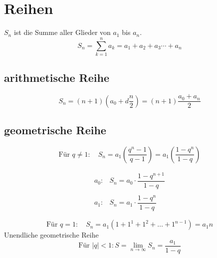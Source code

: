\section{Reihen}
$S_n$ ist die Summe aller Glieder von $a_1$ bis $a_n$. 
\[ \boxed{S_n = \sum_{k=1}^{n} a_k = a_1 + a_2 + a_3 \cdots + a_n} \]

\subsection{arithmetische Reihe}
\[ \boxed{S_n = \left(n + 1\right)\left(a_0 + d \frac{n}{2}\right) = \left(n + 1\right) \frac{a_0 + a_n}{2}} \]

\subsection{geometrische Reihe}
\[ \boxed{\text{Für } q \neq 1: \quad S_n = a_1 \left(  \frac{q^n - 1}{q - 1} \right) = a_1 \left(  \frac{1 - q^n}{1 - q} \right)} \]

\[ \boxed{\begin{array}{ll}
a_0 :& S_n = a_0 \cdot \dfrac{1-q^{n+1}}{1-q} \\ 
& \\
a_1 :& S_n = a_1 \cdot \dfrac{1-q^n}{1-q}
\end{array}} \]

\[ \boxed{\text{Für } q = 1: \quad S_n = a_1 \left(1+1^1 + 1^2 + \ldots + 1^{n-1}\right) = a_1 n} \]
Unendliche geometrische Reihe
\[ \boxed{\text{Für } |q| < 1: S = \lim_{n \rightarrow \infty} S_n = \frac{a_1}{1 - q}} \]
